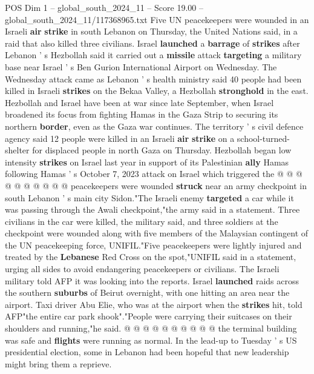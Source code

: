 \begin{textsample}{POS Dim 1 – global\_south\_2024\_11 – Score 19.00 – global\_south\_2024\_11/117368965.txt}  \label{ex:f1_pos_177}
Five UN peacekeepers were wounded in an Israeli \textbf{air} \textbf{strike} in south Lebanon on Thursday, the United Nations said, in a raid that also killed three civilians.
Israel \textbf{launched} a \textbf{barrage} of \textbf{strikes} after Lebanon ' s Hezbollah said it carried out a \textbf{missile} attack \textbf{targeting} a military base near Israel ' s Ben Gurion International Airport on Wednesday.
The Wednesday attack came as Lebanon ' s health ministry said 40 people had been killed in Israeli \textbf{strikes} on the Bekaa Valley, a Hezbollah \textbf{stronghold} in the east.
Hezbollah and Israel have been at war since late September, when Israel broadened its focus from fighting Hamas in the Gaza Strip to securing its northern \textbf{border}, even as the Gaza war continues.
The territory ' s civil defence agency said 12 people were killed in an Israeli \textbf{air} \textbf{strike} on a school-turned-shelter for displaced people in north Gaza on Thursday.
Hezbollah began low intensity \textbf{strikes} on Israel last year in support of its Palestinian \textbf{ally} Hamas following Hamas ' s October 7, 2023 attack on Israel which triggered the @ @ @ @ @ @ @ @ @ @ peacekeepers were wounded \textbf{struck} near an army checkpoint in south Lebanon ' s main city Sidon."The Israeli enemy \textbf{targeted} a car while it was passing through the Awali checkpoint,"the army said in a statement.
Three civilians in the car were killed, the military said, and three soldiers at the checkpoint were wounded along with five members of the Malaysian contingent of the UN peacekeeping force, UNIFIL."Five peacekeepers were lightly injured and treated by the \textbf{Lebanese} Red Cross on the spot,"UNIFIL said in a statement, urging all sides to avoid endangering peacekeepers or civilians.
The Israeli military told AFP it was looking into the reports.
Israel \textbf{launched} raids across the southern \textbf{suburbs} of Beirut overnight, with one hitting an area near the airport.
Taxi driver Abu Elie, who was at the airport when the \textbf{strikes} hit, told AFP"the entire car park shook"."People were carrying their suitcases on their shoulders and running,"he said. @ @ @ @ @ @ @ @ @ @ the terminal building was safe and \textbf{flights} were running as normal.
In the lead-up to Tuesday ' s US presidential election, some in Lebanon had been hopeful that new leadership might bring them a reprieve.

\end{textsample}
